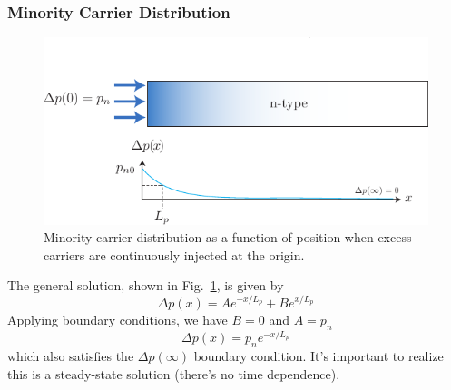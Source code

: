 \subsubsection*{Minority Carrier Distribution}
\begin{figure}[tb]
\centering
\includegraphics[width=.75\columnwidth]{excess_charge_inject_sol}
\caption{Minority carrier distribution as a function of position when excess carriers are continuously injected at the origin.}
\label{fig:excess_charge_inject_sol}
\end{figure}
The general solution, shown in Fig.~\ref{fig:excess_charge_inject_sol}, is given by
    \begin{equation}
        \Delta p(x) = A e^{-x/L_p} + B e^{x/L_p}
    \end{equation}	
 Applying boundary conditions, we have $B = 0$ and $A = p_{n}$
    \begin{equation}
        \Delta p(x) = p_n e^{-x/L_p} 
    \end{equation}	
which also satisfies the $\Delta p(\infty)$ boundary condition.  It's important to realize this is a steady-state solution (there's no time dependence).   
